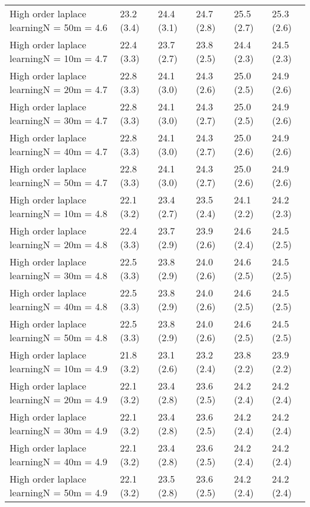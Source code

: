 \documentclass{article}
\begin{document}
\begin{table*}[t!]
\begin{center}
\begin{small}
\begin{sc}
\begin{tabular}{llllll}
High order laplace learningN = 50m = 4.6&23.2 (3.4)      &24.4 (3.1)      &24.7 (2.8)      &25.5 (2.7)      &25.3 (2.6)      \\
High order laplace learningN = 10m = 4.7&22.4 (3.3)      &23.7 (2.7)      &23.8 (2.5)      &24.4 (2.3)      &24.5 (2.3)      \\
High order laplace learningN = 20m = 4.7&22.8 (3.3)      &24.1 (3.0)      &24.3 (2.6)      &25.0 (2.5)      &24.9 (2.6)      \\
High order laplace learningN = 30m = 4.7&22.8 (3.3)      &24.1 (3.0)      &24.3 (2.7)      &25.0 (2.5)      &24.9 (2.6)      \\
High order laplace learningN = 40m = 4.7&22.8 (3.3)      &24.1 (3.0)      &24.3 (2.7)      &25.0 (2.6)      &24.9 (2.6)      \\
High order laplace learningN = 50m = 4.7&22.8 (3.3)      &24.1 (3.0)      &24.3 (2.7)      &25.0 (2.6)      &24.9 (2.6)      \\
High order laplace learningN = 10m = 4.8&22.1 (3.2)      &23.4 (2.7)      &23.5 (2.4)      &24.1 (2.2)      &24.2 (2.3)      \\
High order laplace learningN = 20m = 4.8&22.4 (3.3)      &23.7 (2.9)      &23.9 (2.6)      &24.6 (2.4)      &24.5 (2.5)      \\
High order laplace learningN = 30m = 4.8&22.5 (3.3)      &23.8 (2.9)      &24.0 (2.6)      &24.6 (2.5)      &24.5 (2.5)      \\
High order laplace learningN = 40m = 4.8&22.5 (3.3)      &23.8 (2.9)      &24.0 (2.6)      &24.6 (2.5)      &24.5 (2.5)      \\
High order laplace learningN = 50m = 4.8&22.5 (3.3)      &23.8 (2.9)      &24.0 (2.6)      &24.6 (2.5)      &24.5 (2.5)      \\
High order laplace learningN = 10m = 4.9&21.8 (3.2)      &23.1 (2.6)      &23.2 (2.4)      &23.8 (2.2)      &23.9 (2.2)      \\
High order laplace learningN = 20m = 4.9&22.1 (3.2)      &23.4 (2.8)      &23.6 (2.5)      &24.2 (2.4)      &24.2 (2.4)      \\
High order laplace learningN = 30m = 4.9&22.1 (3.2)      &23.4 (2.8)      &23.6 (2.5)      &24.2 (2.4)      &24.2 (2.4)      \\
High order laplace learningN = 40m = 4.9&22.1 (3.2)      &23.4 (2.8)      &23.6 (2.5)      &24.2 (2.4)      &24.2 (2.4)      \\
High order laplace learningN = 50m = 4.9&22.1 (3.2)      &23.5 (2.8)      &23.6 (2.5)      &24.2 (2.4)      &24.2 (2.4)      \\

\end{tabular}
\end{sc}
\end{small}
\end{center}
\end{table*}
\end{document}
